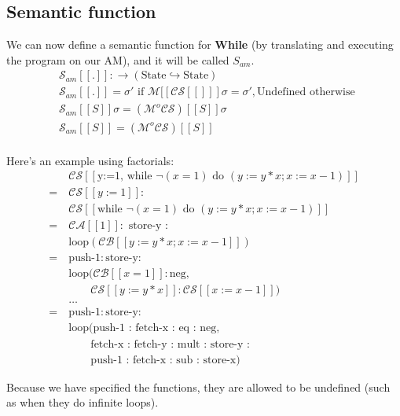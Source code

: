 \documentclass[11pt,a4paper,headsepline,titlepage,dvipsnames,cmyk]{scrartcl}
\newcommand\pfun{\hookrightarrow}
\begin{document}
\subsection{Semantic function}%
\label{sub:Semantic-function}
We can now define a semantic function for \textbf{While} (by translating
and executing the program on our AM), and it will be called $S_{am}$.
\begin{align*}
    &\mathcal{S}_{am} [\![.]\!]: \rightarrow (\text{State}\pfun\text{State}) \\
    &\mathcal{S}_{am} [\![.]\!] = \sigma' \text{ if }
    \mathcal{M}[\![\mathcal{CS}[\![]\!]\!] \sigma = \sigma', \text{
    Undefined otherwise } \\
    &\mathcal{S}_{am} [\![S]\!] \sigma = (\mathcal{M} ^o
    \mathcal{CS})[\![S]\!] \sigma \\
    &\mathcal{S}_{am} [\![S]\!] = (\mathcal{M} ^o
    \mathcal{CS})[\![S]\!] \\
\end{align*}

Here's an example using factorials:
\begin{align*}
    &\mathcal{CS} [\![\text{y:=1, while } \neg (x=1) \text{ do } (y:=y * x;
    x:=x-1)]\!] \\
    = \ &\mathcal{CS}[\![y:=1]\!]: \\
      &\mathcal{ CS}[\![\text{while } \neg (x=1) \text{ do }
      (y:=y*x;x:=x-1)]\!] \\
    = \ &\mathcal{CA}[\![1]\!]: \text{ store-y }: \\
      &\text{loop}(\mathcal{CB}[\![y:=y * x; x:= x-1]\!]) \\
    = \ &\text{push-1}: \text{store-y}: \\
      &\text{loop}(\mathcal{CB}[\![x=1]\!]: \text{neg}, \\
      &\quad \quad \mathcal{CS}[\![y:=y * x]\!] : \mathcal{CS}[\![x:=x-1]\!])\\
    &\dots \\
    = \ &\text{push-1}:\text{store-y}: \\
    &\text{loop}(\text{push-1 : fetch-x : eq : neg,} \\
    &\quad \quad \text{fetch-x : fetch-y : mult : store-y :} \\
    &\quad  \quad\text{push-1 : fetch-x : sub : store-x})
\end{align*}

Because we have specified the functions, they are allowed to be undefined
(such as when they do infinite loops). 
\end{document}

